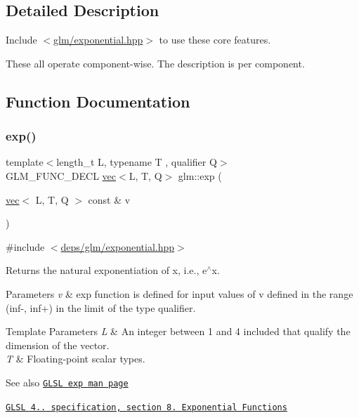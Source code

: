 \subsection{Detailed Description}
Include $<$\hyperlink{exponential_8hpp}{glm/exponential.\+hpp}$>$ to use these core features.

These all operate component-\/wise. The description is per component. 

\subsection{Function Documentation}
\mbox{\label{group__core__func__exponential_ga071566cadc7505455e611f2a0353f4d4}} 
\subsubsection{\texorpdfstring{exp()}{exp()}}
{\footnotesize\ttfamily template$<$length\+\_\+t L, typename T , qualifier Q$>$ \\
G\+L\+M\+\_\+\+F\+U\+N\+C\+\_\+\+D\+E\+CL \hyperlink{structglm_1_1vec}{vec}$<$L, T, Q$>$ glm\+::exp (\begin{DoxyParamCaption}\item[{\hyperlink{structglm_1_1vec}{vec}$<$ L, T, Q $>$ const \&}]{v }\end{DoxyParamCaption})}



{\ttfamily \#include $<$\hyperlink{exponential_8hpp}{deps/glm/exponential.\+hpp}$>$}

Returns the natural exponentiation of x, i.\+e., e$^\wedge$x.


\begin{DoxyParams}{Parameters}
{\em v} & exp function is defined for input values of v defined in the range (inf-\/, inf+) in the limit of the type qualifier. \\
\hline
\end{DoxyParams}

\begin{DoxyTemplParams}{Template Parameters}
{\em L} & An integer between 1 and 4 included that qualify the dimension of the vector. \\
\hline
{\em T} & Floating-\/point scalar types.\\
\hline
\end{DoxyTemplParams}
\begin{DoxySeeAlso}{See also}
\href{http://www.opengl.org/sdk/docs/manglsl/xhtml/exp.xml}{\tt G\+L\+SL exp man page} 

\href{http://www.opengl.org/registry/doc/GLSLangSpec.4.20.8.pdf}{\tt G\+L\+SL 4.. specification, section 8. Exponential Functions} 
\end{DoxySeeAlso}


